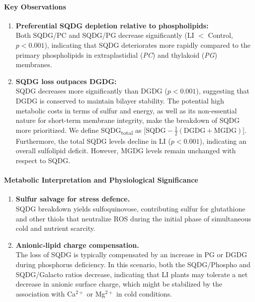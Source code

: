 \documentclass[10pt,letterpaper]{article}
\begin{document}
\paragraph{Key Observations}
\begin{enumerate}
  \item \textbf{Preferential SQDG depletion relative to phospholipids: } \\ 
  Both SQDG/PC and SQDG/PG decrease significantly (LI $<$ Control, $p<0.001$), indicating that SQDG deteriorates more rapidly compared to the primary phospholipids in extraplastidial (\textit{PC}) and thylakoid (\textit{PG}) membranes.
  
  \item \textbf{SQDG loss outpaces DGDG: }\\
  SQDG decreases more significantly than DGDG ($p<0.001$), suggesting that DGDG is conserved to maintain bilayer stability. The potential high metabolic costs in terms of sulfur and energy, as well as its non-essential nature for short-term membrane integrity, make the breakdown of SQDG more prioritized. We define {SQDG\textsubscript{total}} as \(\bigl[\mathrm{SQDG}-\tfrac12(\mathrm{DGDG}+\mathrm{MGDG})\bigr]\). Furthermore, the total SQDG levels decline in LI ($p<0.001$), indicating an overall sulfolipid deficit. However, MGDG levels remain unchanged with respect to SQDG.
  
\end{enumerate}

\paragraph{Metabolic Interpretation and Physiological Significance}
\vspace{-0.5ex}
\begin{enumerate}
  \item \textbf{Sulfur salvage for stress defence.} \\ 
        SQDG breakdown yields sulfoquinovose, contributing sulfur for glutathione and other thiols that neutralize ROS during the initial phase of simultaneous cold and nutrient scarcity.
  \item \textbf{Anionic‐lipid charge compensation.} \\
        The loss of SQDG is typically compensated by an increase in PG or DGDG during phosphorus deficiency. In this scenario, both the SQDG/Phospho and SQDG/Galacto ratios decrease, indicating that LI plants may tolerate a net decrease in anionic surface charge, which might be stabilized by the association with Ca\(^{2+}\) or Mg\(^{2+}\) in cold conditions.
\end{enumerate}
\end{document}

